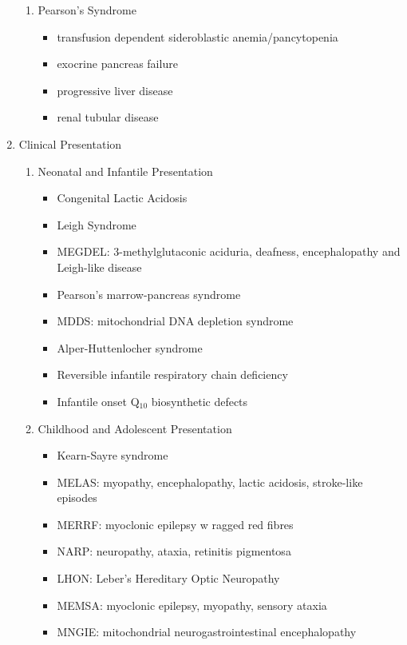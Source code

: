 \documentclass{scrartcl}
\begin{document}
\begin{enumerate}
\begin{enumerate}
\item Pearson's Syndrome
\label{sec:org1e47e40}
\begin{itemize}
\item transfusion dependent sideroblastic anemia/pancytopenia
\item exocrine pancreas failure
\item progressive liver disease
\item renal tubular disease
\end{itemize}
\end{enumerate}

\item Clinical Presentation
\label{sec:org5c81f9f}
\begin{enumerate}
\item Neonatal and Infantile Presentation
\label{sec:org61f8107}
\begin{itemize}
\item Congenital Lactic Acidosis
\item Leigh Syndrome
\item MEGDEL: 3-methylglutaconic aciduria, deafness, encephalopathy and Leigh-like disease
\item Pearson's marrow-pancreas syndrome
\item MDDS: mitochondrial DNA depletion syndrome
\item Alper-Huttenlocher syndrome
\item Reversible infantile respiratory chain deficiency
\item Infantile onset Q\(_{\text{10}}\) biosynthetic defects
\end{itemize}

\item Childhood and Adolescent Presentation
\label{sec:org0d04bc4}
\begin{itemize}
\item Kearn-Sayre syndrome
\item MELAS: myopathy, encephalopathy, lactic acidosis, stroke-like episodes
\item MERRF: myoclonic epilepsy w ragged red fibres
\item NARP: neuropathy, ataxia, retinitis pigmentosa
\item LHON: Leber's Hereditary Optic Neuropathy
\item MEMSA: myoclonic epilepsy, myopathy, sensory ataxia
\item MNGIE: mitochondrial neurogastrointestinal encephalopathy
\end{itemize}


\end{enumerate}
\end{enumerate}
\end{document}
